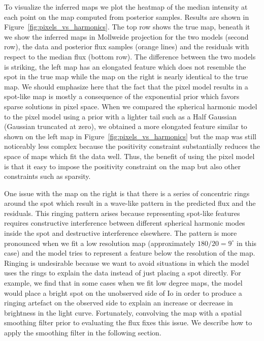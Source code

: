 \documentclass[modern]{aastex62}
\begin{document}
To visualize the inferred maps we plot the heatmap of the median intensity at each point on the map computed from posterior samples.
Results are shown in Figure~\ref{fig:pixels_vs_harmonics}.
The top row shows the true map, beneath it we show the inferred maps in Mollweide projection for the two models (second row), the data and posterior flux samples (orange lines) and the residuals with respect to the median flux (bottom row).
The difference between the two models is striking, the left map has an elongated feature which does not resemble the spot in the true map while the map on the right is nearly identical to the true map. 
We should emphasize here that the fact that the pixel model results in a spot-like map is mostly a consequence of the exponential prior which favors sparse solutions in pixel space.
When we compared the spherical harmonic model to the pixel model using a prior with a lighter tail such as a Half Gaussian (Gaussian truncated at zero), we obtained a more elongated feature similar to shown on the left map in Figure~\ref{fig:pixels_vs_harmonics} but the map was still noticeably less complex because the positivity constraint substantially reduces the space of maps which fit the data well. 
Thus, the benefit of using the pixel model is that it easy to impose the positivity constraint on the map but also other constraints such as sparsity.

One issue with the map on the right is that there is a series of concentric rings around the spot which result in a wave-like pattern in the predicted flux and the residuals.
This ringing pattern arises because representing spot-like features requires constructive interference between different spherical harmonic modes inside the spot and destructive interference elsewhere.
The pattern is more pronounced when we fit a low resolution map (approximately $180/20=9^\circ$ in this case) and the model tries to represent a feature below the resolution of the map.
Ringing is undesirable because we want to avoid situations in which the model uses the rings to explain the data instead of just placing a spot directly. 
For example, we find that in some cases when we fit low degree maps, the model would place a bright spot on the unobserved side of Io in order to produce a ringing artefact on the observed side to explain an increase or decrease in brightness in the light curve. 
Fortunately, convolving the map with a spatial smoothing filter prior to evaluating the flux fixes this issue. 
We describe how to apply the smoothing filter in the following section.
\end{document}
